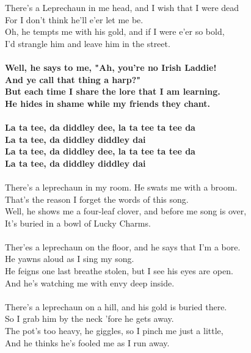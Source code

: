 There's a Leprechaun in me head, and I wish that I were dead\\
For I don't think he'll e'er let me be.\\
Oh, he tempts me with his gold, and if I were e'er so bold,\\
I'd strangle him and leave him in the street.\\
~\\

\textbf{Well, he says to me, "Ah, you're no Irish Laddie!\\
And ye call that thing a harp?"\\
But each time I share the lore that I am learning.\\
He hides in shame while my friends they chant.\\
~\\ 
La ta tee, da diddley dee, la ta tee ta tee da\\
La ta tee, da diddley diddley dai\\
La ta tee, da diddley dee, la ta tee ta tee da\\
La ta tee, da diddley diddley dai\\}
~\\
There's a leprechaun in my room. He swats me with a broom.\\
That's the reason I forget the words of this song.\\
Well, he shows me a four-leaf clover, and before me song is over,\\
It's buried in a bowl of Lucky Charms.\\
~\\
Ther'es a leprechaun on the floor, and he says that I'm a bore.\\
He yawns aloud as I sing my song.\\
He feigns one last breathe stolen, but I see his eyes are open.\\
And he's watching me with envy deep inside.\\
~\\
There's a leprechaun on a hill, and his gold is buried there.\\
So I grab him by the neck 'fore he gets away.\\
The pot's too heavy, he giggles, so I pinch me just a little,\\
And he thinks he's fooled me as I run away.\\





